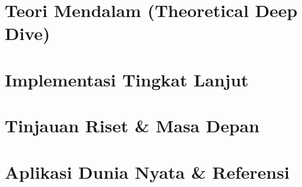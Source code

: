 \documentclass[12pt, a4paper, openany]{book}
\begin{document}
\part{Teori Mendalam (Theoretical Deep Dive)}




\part{Implementasi Tingkat Lanjut}


\part{Tinjauan Riset \& Masa Depan}




\part{Aplikasi Dunia Nyata \& Referensi}










\end{document}
